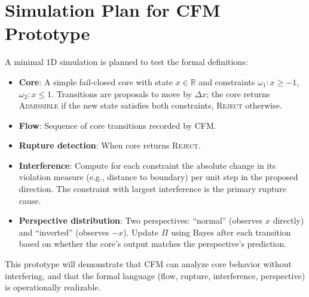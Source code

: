 \documentclass{article}
\begin{document}
\appendix
\section{Simulation Plan for CFM Prototype}
A minimal 1D simulation is planned to test the formal definitions:
\begin{itemize}
\item \textbf{Core}: A simple fail-closed core with state \(x \in \mathbb{R}\) and constraints \(\omega_1: x \ge -1\), \(\omega_2: x \le 1\). Transitions are proposals to move by \(\Delta x\); the core returns \textsc{Admissible} if the new state satisfies both constraints, \textsc{Reject} otherwise.
\item \textbf{Flow}: Sequence of core transitions recorded by CFM.
\item \textbf{Rupture detection}: When core returns \textsc{Reject}.
\item \textbf{Interference}: Compute for each constraint the absolute change in its violation measure (e.g., distance to boundary) per unit step in the proposed direction. The constraint with largest interference is the primary rupture cause.
\item \textbf{Perspective distribution}: Two perspectives: ``normal'' (observes \(x\) directly) and ``inverted'' (observes \(-x\)). Update \(\Pi\) using Bayes after each transition based on whether the core's output matches the perspective's prediction.
\end{itemize}
This prototype will demonstrate that CFM can analyze core behavior without interfering, and that the formal language (flow, rupture, interference, perspective) is operationally realizable.
\end{document}
